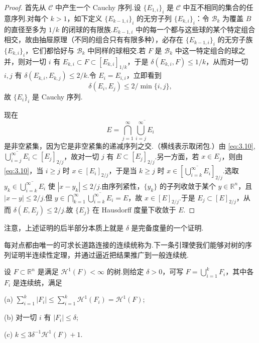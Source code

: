 \begin{proof}
首先从 $\mathcal{C}$ 中产生一个 Cauchy 序列.设 $\{E_{1,i}\}_i$ 是 $\mathcal{C}$ 中互不相同的集合的任意序列.对每个 $k>1$，如下定义 $\{E_{k-1,i}\}_i$ 的无穷子列 $\{E_{k,i}\}_i$：令 $\mathcal{B}_k$ 为覆盖 $B$ 的直径至多为 $1/k$ 的闭球的有限族.$E_{k-1,i}$ 中的每一个都与这些球的某个特定组合相交，故由抽屉原理（不同的组合只有有限多种），必存在 $\{E_{k-1,i}\}_i$ 的无穷子族 $\{E_{k,i}\}_i$，它们都恰好与 $\mathcal{B}_k$ 中同样的球相交.若 $F$ 是 $\mathcal{B}_k$ 中这一特定组合的球之并，则对一切 $i$ 有 $E_{k,i}\subset F\subset[E_{k,i}]_{1/k}$，于是 $\delta(E_{k,i},F)\leq 1/k$，从而对一切 $i,j$ 有 $\delta(E_{k,i},E_{k,j})\leq 2/k$.令 $E_i=E_{i,i}$，立即看到
\begin{equation}\label{eq:3.10}
  \delta(E_i,E_j)\leq 2/\min\{i,j\},
\end{equation}
故 $\{E_i\}_i$ 是 Cauchy 序列.

现在
\[
  E=\bigcap_{j=1}^{\infty}\overline{\bigcup_{i=j}^{\infty}E_i}
\]
是非空紧集，因为它是非空紧集的递减序列之交.（横线表示取闭包.）由 \eqref{eq:3.10}, $\overline{\bigcup_{i=j}^{\infty}E_i}\subset[E_j]_{2/j}$，故对一切 $j$ 有 $E\subset[E_j]_{2/j}$.另一方面，若 $x\in E_j$，则由 \eqref{eq:3.10}，当 $i\geq j$ 时 $x\in[E_i]_{2/j}$，于是当 $k\geq j$ 时 $x\in[\overline{\bigcup_{i=k}^{\infty}E_i}]_{2/j}$.选取 $y_k\in\overline{\bigcup_{i=k}^{\infty}E_i}$ 使 $|x-y_k|\leq 2/j$.由序列紧性，$\{y_k\}$ 的子列收敛于某个 $y\in\mathbb{R}^n$，且 $|x-y|\leq 2/j$.但 $y\in\bigcap_{k=1}^{\infty}\overline{\bigcup_{i=k}^{\infty}E_i}=E$，故 $x\in[E]_{2/j}$.于是 $E_j\subset[E]_{2/j}$，从而 $\delta(E,E_j)\leq 2/j$.故 $\{E_j\}$ 在 Hausdorff 度量下收敛于 $E$.
\end{proof}

注意，上述证明的后半部分本质上就是 $\delta$ 是完备度量的一个证明.

每对点都由唯一的可求长道路连接的连续统称为.下一条引理使我们能够对树的序列证明半连续性定理，并通过逼近把结果推广到一般连续统.

\begin{lemma}\label{lem:3.17}
设 $F\subset\mathbb{R}^n$ 是满足 $\mathcal{H}^1(F)<\infty$ 的树.则给定 $\delta>0$，可写 $F=\bigcup_{i=1}^{k}F_i$，其中各 $F_i$ 是连续统，满足

(a) $\sum_{i=1}^{k}|F_i|\leq\sum_{i=1}^{k}\mathcal{H}^1(F_i)=\mathcal{H}^1(F)$;

(b) 对一切 $i$ 有 $|F_i|\leq\delta$;

(c) $k\leq 3\delta^{-1}\mathcal{H}^1(F)+1$.
\end{lemma}

